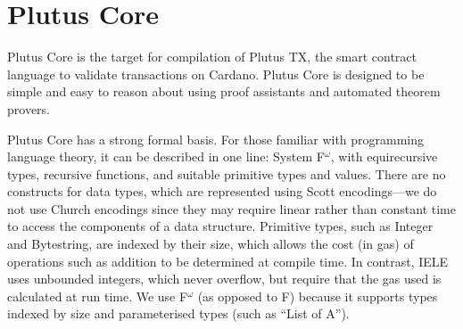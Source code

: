 \documentclass[conference]{IEEEtran}
\newcommand{\Fomega}{F$^{\omega}$}
\begin{document}
\thispagestyle{plain}
\pagestyle{plain}









%
\IEEEpeerreviewmaketitle




\section{Plutus Core}

Plutus Core is the target for compilation of Plutus TX, the smart
contract language to validate transactions on Cardano. Plutus Core is
designed to be simple and easy to reason about using proof assistants
and automated theorem provers.

Plutus Core has a strong formal basis. For those familiar with
programming language theory, it can be described in one line: System
\Fomega{}, with equirecursive types, recursive functions, and suitable
primitive types and values. There are no constructs for data types,
which are represented using Scott encodings---we do not use Church
encodings since they may require linear rather than constant time to
access the components of a data structure. Primitive types, such as
Integer and Bytestring, are indexed by their size, which allows the
cost (in gas) of operations such as addition to be determined at
compile time. In contrast, IELE uses unbounded integers, which never
overflow, but require that the gas used is calculated at run time. We
use \Fomega{} (as opposed to F) because it supports types indexed by
size and parameterised types (such as ``List of A'').
\end{document}
